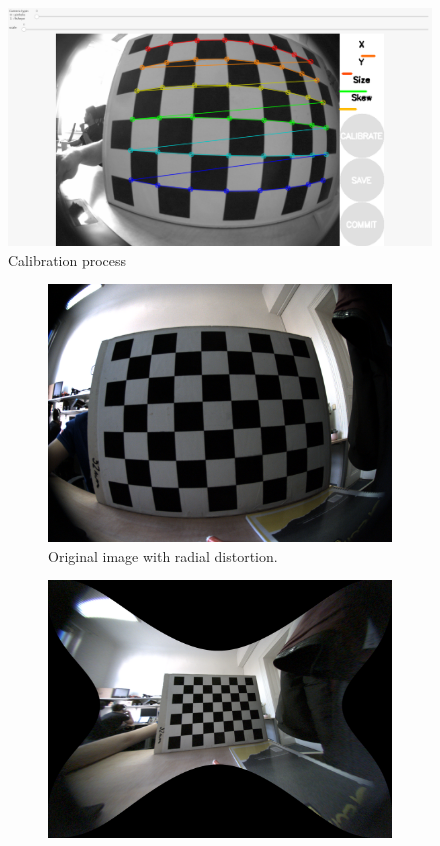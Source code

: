 \begin{figure}[h]
    \centering
    \includegraphics[width=.6\textwidth]{graphics/calibration.png}
    \caption{Calibration process}
    \label{fig:calib}
\end{figure}

\begin{figure}[!hp]
    \begin{subfigure}[b]{0.45\textwidth}
      \includegraphics[width=\textwidth]{graphics/chessboard_img.png}
      \caption{Original image with radial distortion.}
      \label{fig:chb1}
    \end{subfigure}
    \hfill
    \begin{subfigure}[b]{0.45\textwidth}
      \includegraphics[width=\textwidth]{graphics/chessboard_img_rect.png}

\end{subfigure}
\end{figure}
